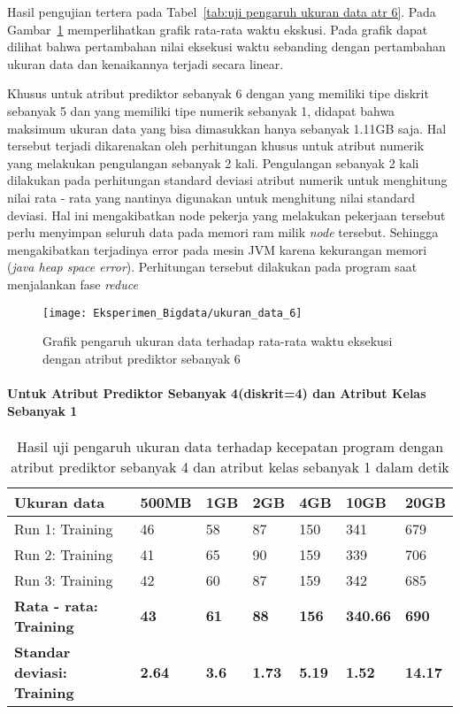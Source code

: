 Hasil pengujian tertera pada Tabel~\ref{tab:uji pengaruh ukuran data atr 6}. Pada Gambar~\ref{fig:Grafik pengaruh ukuran data terhadap rata-rata waktu eksekusi atr 6} memperlihatkan grafik rata-rata waktu ekskusi. Pada grafik dapat dilihat bahwa pertambahan nilai eksekusi waktu sebanding dengan pertambahan ukuran data dan kenaikannya terjadi secara linear.


Khusus untuk atribut prediktor sebanyak 6 dengan yang memiliki tipe diskrit sebanyak 5 dan yang memiliki tipe numerik sebanyak 1, didapat bahwa maksimum ukuran data yang bisa dimasukkan hanya sebanyak 1.11GB saja. Hal tersebut terjadi dikarenakan oleh perhitungan khusus untuk atribut numerik yang melakukan pengulangan sebanyak 2 kali. Pengulangan sebanyak 2 kali dilakukan pada perhitungan standard deviasi atribut numerik untuk menghitung nilai rata - rata yang nantinya digunakan untuk menghitung nilai standard deviasi. Hal ini mengakibatkan node pekerja yang melakukan pekerjaan tersebut perlu menyimpan seluruh data pada memori ram milik \textit{node} tersebut. Sehingga mengakibatkan terjadinya error pada mesin JVM karena kekurangan memori (\textit{java heap space error}). Perhitungan tersebut dilakukan pada program saat menjalankan fase \textit{reduce}

\begin{figure}[H]
	\centering
	\texttt{[image: Eksperimen\_Bigdata/ukuran\_data\_6]}
	\caption[Grafik pengaruh ukuran data terhadap rata-rata waktu eksekusi dengan atribut prediktor sebanyak 6]{Grafik pengaruh ukuran data terhadap rata-rata waktu eksekusi dengan atribut prediktor sebanyak 6}
	\label{fig:Grafik pengaruh ukuran data terhadap rata-rata waktu eksekusi atr 6}
\end{figure}

\paragraph{Untuk Atribut Prediktor Sebanyak 4(diskrit=4) dan Atribut Kelas Sebanyak 1}

\begin{table}[H]
\label{tab:uji pengaruh ukuran data atr 4}
\centering
\caption{Hasil uji pengaruh ukuran data terhadap kecepatan program dengan atribut prediktor sebanyak 4 dan atribut kelas sebanyak 1 dalam detik}
\begin{tabular}{ | l | l | l | l | l | l | l | }
\hline
Ukuran data & 500MB & 1GB & 2GB & 4GB & 10GB & 20GB \\ \hline \hline
Run 1: Training & 46 & 58 & 87 & 150 & 341 & 679  \\ \hline
Run 2: Training & 41 & 65 & 90 & 159 & 339 & 706  \\ \hline
Run 3: Training & 42 & 60 & 87 & 159 & 342 & 685  \\ \hline
\textbf{Rata - rata: Training} & \textbf{43} & \textbf{61} & \textbf{88} & \textbf{156} & \textbf{340.66} & \textbf{690} \\ \hline
\textbf{Standar deviasi: Training} & \textbf{2.64} & \textbf{3.6} & \textbf{1.73} & \textbf{5.19} & \textbf{1.52} & \textbf{14.17} \\ \hline
\end{tabular}
\end{table}

